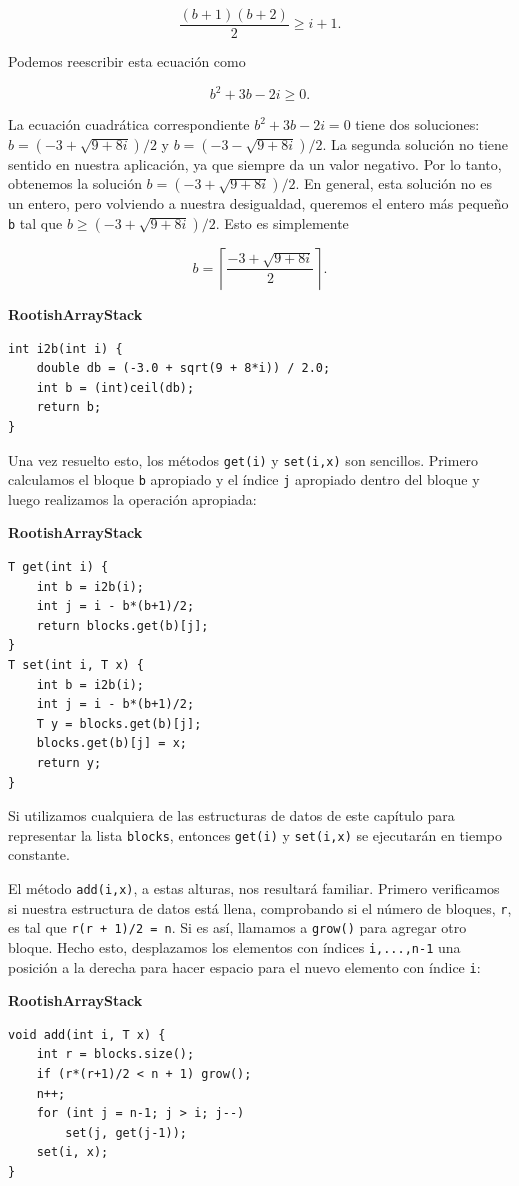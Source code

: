 \documentclass[11pt]{book}
\theoremstyle{plain}
\newcommand{\claseheader}[1]{\noindent\textbf{#1}\par\vspace{-4pt}}
\begin{document}
$$
\frac{(b + 1)(b + 2)}{2} \ge i + 1 .
$$

Podemos reescribir esta ecuación como

$$
b^2 + 3b - 2i \ge 0 .
$$

La ecuación cuadrática correspondiente $b^2 + 3b - 2i = 0$ tiene dos soluciones: $b = (-3 + \sqrt{9 + 8i})/2$ y $b = (-3 - \sqrt{9 + 8i})/2$. La segunda solución no tiene sentido en nuestra aplicación, ya que siempre da un valor negativo. Por lo tanto, obtenemos la solución $b = (-3 + \sqrt{9 + 8i})/2$. En general, esta solución no es un entero, pero volviendo a nuestra desigualdad, queremos el entero más pequeño \texttt{b} tal que $b \ge (-3 + \sqrt{9 + 8i})/2$. Esto es simplemente

$$
b = \left\lceil \frac{-3 + \sqrt{9 + 8i}}{2} \right\rceil .
$$

\claseheader{RootishArrayStack}
\begin{lstlisting}
int i2b(int i) {
    double db = (-3.0 + sqrt(9 + 8*i)) / 2.0;
    int b = (int)ceil(db);
    return b;
}
\end{lstlisting}

Una vez resuelto esto, los métodos \texttt{get(i)} y \texttt{set(i,x)} son sencillos. Primero calculamos el bloque \texttt{b} apropiado y el índice \texttt{j} apropiado dentro del bloque y luego realizamos la operación apropiada:

\claseheader{RootishArrayStack}
\begin{lstlisting}
T get(int i) {
    int b = i2b(i);
    int j = i - b*(b+1)/2;
    return blocks.get(b)[j];
}
T set(int i, T x) {
    int b = i2b(i);
    int j = i - b*(b+1)/2;
    T y = blocks.get(b)[j];
    blocks.get(b)[j] = x;
    return y;
}
\end{lstlisting}

Si utilizamos cualquiera de las estructuras de datos de este capítulo para representar la lista \texttt{blocks}, entonces \texttt{get(i)} y \texttt{set(i,x)} se ejecutarán en tiempo constante.

El método \texttt{add(i,x)}, a estas alturas, nos resultará familiar. Primero verificamos si nuestra estructura de datos está llena, comprobando si el número de bloques, \texttt{r}, es tal que \texttt{r(r + 1)/2 = n}. Si es así, llamamos a \texttt{grow()} para agregar otro bloque. Hecho esto, desplazamos los elementos con índices \texttt{i,...,n-1} una posición a la derecha para hacer espacio para el nuevo elemento con índice \texttt{i}:

\claseheader{RootishArrayStack}
\begin{lstlisting}
void add(int i, T x) {
    int r = blocks.size();
    if (r*(r+1)/2 < n + 1) grow();
    n++;
    for (int j = n-1; j > i; j--)
        set(j, get(j-1));
    set(i, x);
}
\end{lstlisting}
\end{document}

